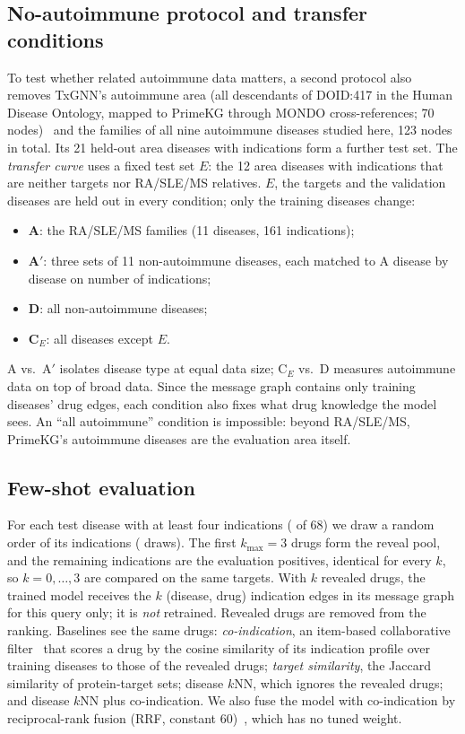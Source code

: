 \documentclass{ieeeaccess}
\begin{document}
\subsection{No-autoimmune protocol and transfer conditions}
\label{sec:transferprotocol}
To test whether related autoimmune data matters, a second protocol also removes TxGNN's autoimmune area (all descendants of DOID:417 in the Human Disease Ontology, mapped to PrimeKG through MONDO cross-references; 70 nodes)~\cite{huang2024txgnn} and the families of all nine autoimmune diseases studied here, 123 nodes in total. Its 21 held-out area diseases with indications form a further test set. The \emph{transfer curve} uses a fixed test set $E$: the 12 area diseases with indications that are neither targets nor RA/SLE/MS relatives. $E$, the targets and the validation diseases are held out in every condition; only the training diseases change:
\begin{itemize}
\item \textbf{A}: the RA/SLE/MS families (11 diseases, 161 indications);
\item \textbf{A$'$}: three sets of 11 non-autoimmune diseases, each matched to A disease by disease on number of indications;
\item \textbf{D}: all \TrDNTrain{} non-autoimmune diseases;
\item \textbf{C$_E$}: all \TrCENTrain{} diseases except $E$.
\end{itemize}
A vs.\ A$'$ isolates disease type at equal data size; C$_E$ vs.\ D measures autoimmune data on top of broad data. Since the message graph contains only training diseases' drug edges, each condition also fixes what drug knowledge the model sees. An ``all autoimmune'' condition is impossible: beyond RA/SLE/MS, PrimeKG's autoimmune diseases are the evaluation area itself.

\subsection{Few-shot evaluation}
\label{sec:fewshotprotocol}
For each test disease with at least four indications (\FsN{} of 68) we draw a random order of its indications (\FsDraws{} draws). The first $k_{\max}=3$ drugs form the reveal pool, and the remaining indications are the evaluation positives, identical for every $k$, so $k=0,\dots,3$ are compared on the same targets. With $k$ revealed drugs, the trained model receives the $k$ (disease, drug) indication edges in its message graph for this query only; it is \emph{not} retrained. Revealed drugs are removed from the ranking. Baselines see the same drugs: \emph{co-indication}, an item-based collaborative filter~\cite{sarwar2001itemcf} that scores a drug by the cosine similarity of its indication profile over training diseases to those of the revealed drugs; \emph{target similarity}, the Jaccard similarity of protein-target sets; disease $k$NN, which ignores the revealed drugs; and disease $k$NN plus co-indication. We also fuse the model with co-indication by reciprocal-rank fusion (RRF, constant 60)~\cite{cormack2009rrf}, which has no tuned weight.
\end{document}
